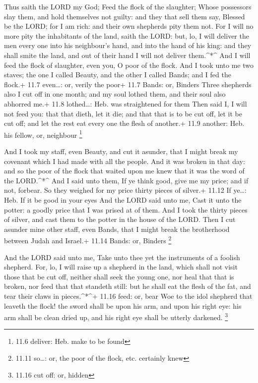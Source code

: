  Thus saith the LORD my God; Feed the flock of the
slaughter;  Whose possessors slay them, and hold themselves
not guilty: and they that sell them say, Blessed be the LORD; for I am
rich: and their own shepherds pity them not.  For I will no
more pity the inhabitants of the land, saith the LORD: but, lo, I will
deliver the men every one into his neighbour's hand, and into the hand
of his king: and they shall smite the land, and out of their hand I will
not deliver them.\^{}*\^{}  And I will feed the flock of
slaughter, even you, O poor of the flock. And I took unto me two staves;
the one I called Beauty, and the other I called Bands; and I fed the
flock.+ 11.7 even\ldots: or, verily the poor+ 11.7 Bands: or, Binders
 Three shepherds also I cut off in one month; and my soul
lothed them, and their soul also abhorred me.+ 11.8 lothed\ldots: Heb.
was straightened for them  Then said I, I will not feed you:
that that dieth, let it die; and that that is to be cut off, let it be
cut off; and let the rest eat every one the flesh of another.+ 11.9
another: Heb. his fellow, or, neighbour \footnote{11.6 deliver: Heb.
  make to be found}

 And I took my staff, even Beauty, and cut it asunder, that
I might break my covenant which I had made with all the people.
 And it was broken in that day: and so the poor of the
flock that waited upon me knew that it was the word of the
LORD.\^{}*\^{}  And I said unto them, If ye think good,
give me my price; and if not, forbear. So they weighed for my price
thirty pieces of silver.+ 11.12 If ye\ldots: Heb. If it be good in your
eyes  And the LORD said unto me, Cast it unto the potter: a
goodly price that I was prised at of them. And I took the thirty pieces
of silver, and cast them to the potter in the house of the LORD.
 Then I cut asunder mine other staff, even Bands, that I
might break the brotherhood between Judah and Israel.+ 11.14 Bands: or,
Binders \footnote{11.11 so\ldots: or, the poor of the flock, etc.
  certainly knew}

 And the LORD said unto me, Take unto thee yet the
instruments of a foolish shepherd.  For, lo, I will raise
up a shepherd in the land, which shall not visit those that be cut off,
neither shall seek the young one, nor heal that that is broken, nor feed
that that standeth still: but he shall eat the flesh of the fat, and
tear their claws in pieces.\^{}*\^{}+ 11.16 feed: or, bear 
Woe to the idol shepherd that leaveth the flock! the sword shall be upon
his arm, and upon his right eye: his arm shall be clean dried up, and
his right eye shall be utterly darkened. \footnote{11.16 cut off: or,
  hidden}

